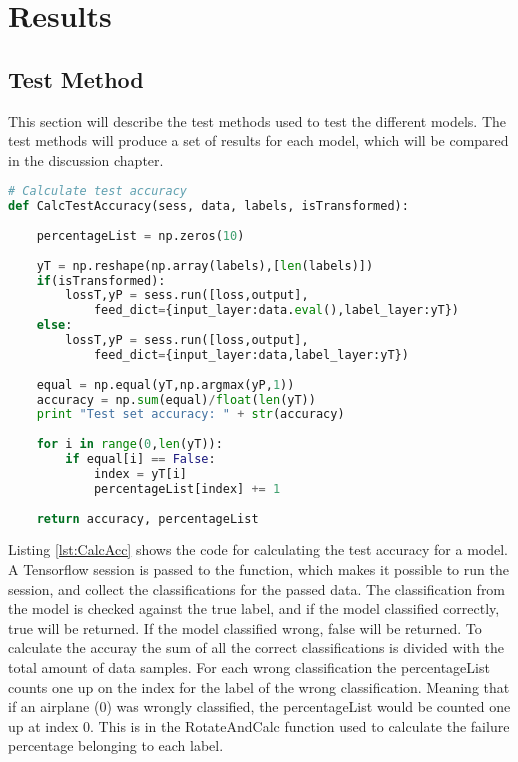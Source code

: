 \chapter{Results}
\label{chp:results}

\section{Test Method}

This section will describe the test methods used to test the different models. The test methods will produce a set of results for each model, which will be compared in the discussion chapter.

\begin{lstlisting}[language=Python, label=lst:CalcAcc, caption=Function to calculate the test accuracy for a model]
# Calculate test accuracy
def CalcTestAccuracy(sess, data, labels, isTransformed):
    
    percentageList = np.zeros(10)
    
    yT = np.reshape(np.array(labels),[len(labels)])
    if(isTransformed):
        lossT,yP = sess.run([loss,output],
        	feed_dict={input_layer:data.eval(),label_layer:yT})
    else:
        lossT,yP = sess.run([loss,output],
        	feed_dict={input_layer:data,label_layer:yT})
    
    equal = np.equal(yT,np.argmax(yP,1))
    accuracy = np.sum(equal)/float(len(yT))
    print "Test set accuracy: " + str(accuracy)
    
    for i in range(0,len(yT)):
        if equal[i] == False:
            index = yT[i]
            percentageList[index] += 1
    
    return accuracy, percentageList
\end{lstlisting}

Listing \ref{lst:CalcAcc} shows the code for calculating the test accuracy for a model. A Tensorflow session is passed to the function, which makes it possible to run the session, and collect the classifications for the passed data. The classification from the model is checked against the true label, and if the model classified correctly, true will be returned. If the model classified wrong, false will be returned. To calculate the accuray the sum of all the correct classifications is divided with the total amount of data samples. For each wrong classification the percentageList counts one up on the index for the label of the wrong classification. Meaning that if an airplane (0) was wrongly classified, the percentageList would be counted one up at index 0. This is in the RotateAndCalc function used to calculate the failure percentage belonging to each label.


